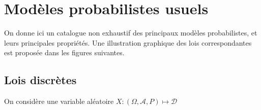 \documentclass[letterpaper,10pt,french]{sphinxmanual}
\begin{document}
\section{Modèles probabilistes usuels}
\label{\detokenize{elemstats:modeles-probabilistes-usuels}}\label{\detokenize{elemstats:loisusuelles}}
\sphinxAtStartPar
On donne ici un catalogue non exhaustif des principaux modèles probabilistes, et leurs principales propriétés. Une illustration graphique des lois correspondantes est proposée dans les figures suivantes.


\subsection{Lois discrètes}
\label{\detokenize{elemstats:lois-discretes}}
\sphinxAtStartPar
On considère une variable aléatoire \(X:(\Omega,\mathcal A,P)\mapsto \mathcal D\)
\end{document}
